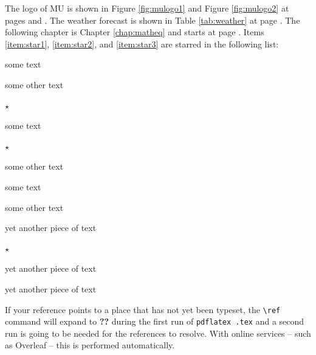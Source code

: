 \documentclass[
  digital,     %
  oneside,     %
  nosansbold,  %
  nocolorbold, %
  lof,         %
  lot,         %
]{fithesis4}
\begin{document}
The logo of \gls{MU} is shown in Figure \ref{fig:mulogo1} and
Figure \ref{fig:mulogo2} at pages \pageref{fig:mulogo1} and
\pageref{fig:mulogo2}. The weather forecast is shown in Table
\ref{tab:weather} at page \pageref{tab:weather}. The following
chapter is Chapter \ref{chap:matheq} and starts at page
\pageref{chap:matheq}.  Items \ref{item:star1}, \ref{item:star2},
and \ref{item:star3} are starred in the following list:
\begin{compactenum}
  \item some text
  \item some other text
  \item $\star$ \label{item:star1}
  \begin{compactenum}
    \item some text
    \item $\star$ \label{item:star2}
    \item some other text
    \begin{compactenum}
      \item some text
      \item some other text
      \item yet another piece of text
      \item $\star$ \label{item:star3}
    \end{compactenum}
    \item yet another piece of text
  \end{compactenum}
  \item yet another piece of text
\end{compactenum}
If your reference points to a place that has not yet been typeset,
the \verb"\ref" command will expand to \textbf{??} during the first
run of
\texttt{pdflatex \jobname.tex}
and a second run is going to be needed for the references to
resolve. With online services -- such as \Gls{Overleaf} -- this is
performed automatically.
\end{document}
